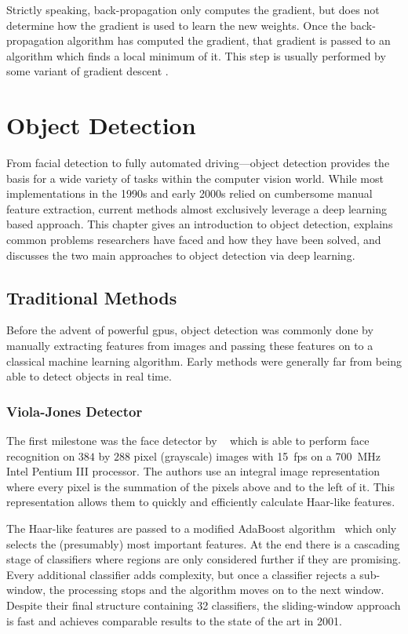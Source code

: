 \documentclass[draft,final]{vutinfth} %
\begin{document}
Strictly speaking, back-propagation only computes the gradient, but
does not determine how the gradient is used to learn the new
weights. Once the back-propagation algorithm has computed the
gradient, that gradient is passed to an algorithm which finds a local
minimum of it. This step is usually performed by some variant of
gradient descent \cite{cauchy1847}.

\section{Object Detection}
\label{sec:background-detection}

From facial detection to fully automated driving—object detection
provides the basis for a wide variety of tasks within the computer
vision world. While most implementations in the 1990s and early 2000s
relied on cumbersome manual feature extraction, current methods almost
exclusively leverage a deep learning based approach. This chapter
gives an introduction to object detection, explains common problems
researchers have faced and how they have been solved, and discusses
the two main approaches to object detection via deep learning.

\subsection{Traditional Methods}
\label{ssec:obj-traditional}

Before the advent of powerful \glspl{gpu}, object detection was
commonly done by manually extracting features from images and passing
these features on to a classical machine learning algorithm. Early
methods were generally far from being able to detect objects in real
time.

\subsubsection{Viola-Jones Detector}
\label{sssec:obj-viola-jones}

The first milestone was the face detector by
~\textcite{viola2001,viola2001} which is able to perform face
recognition on $384$ by $288$ pixel (grayscale) images with
\qty{15}{fps} on a \qty{700}{\MHz} Intel Pentium III processor. The
authors use an integral image representation where every pixel is the
summation of the pixels above and to the left of it. This
representation allows them to quickly and efficiently calculate
Haar-like features.

The Haar-like features are passed to a modified AdaBoost
algorithm~\cite{freund1995} which only selects the (presumably) most
important features. At the end there is a cascading stage of
classifiers where regions are only considered further if they are
promising. Every additional classifier adds complexity, but once a
classifier rejects a sub-window, the processing stops and the
algorithm moves on to the next window. Despite their final structure
containing 32 classifiers, the sliding-window approach is fast and
achieves comparable results to the state of the art in 2001.
\end{document}
